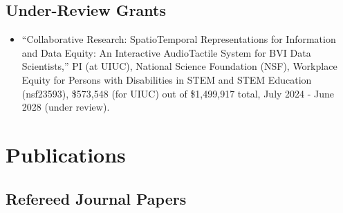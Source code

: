 \documentclass[11pt,a4paper,]{awesome-cv}
\providecommand{\tightlist}{%
	\setlength{\itemsep}{0pt}\setlength{\parskip}{0pt}}
\begin{document}
\subsection{Under-Review Grants}\label{under-review-grants}

\begin{itemize}
\tightlist
\item
  ``Collaborative Research: SpatioTemporal Representations for
  Information and Data Equity: An Interactive AudioTactile System for
  BVI Data Scientists,'' PI (at UIUC), National Science Foundation
  (NSF), Workplace Equity for Persons with Disabilities in STEM and STEM
  Education (nsf23593), \$573,548 (for UIUC) out of \$1,499,917 total,
  July 2024 - June 2028 (under review).
\end{itemize}

\section{Publications}\label{publications}

\subsection{Refereed Journal Papers}\label{refereed-journal-papers}
\end{document}
